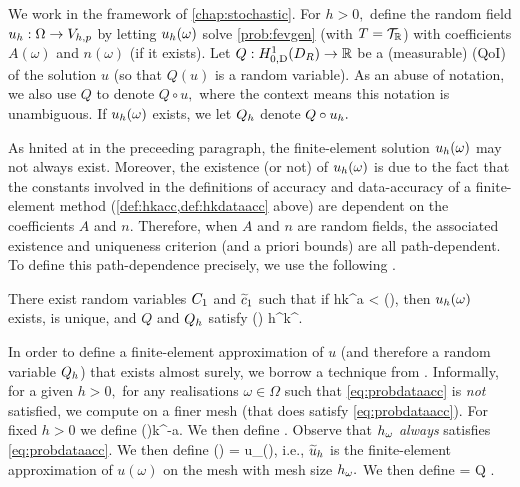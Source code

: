 We work in the framework of \cref{chap:stochastic}. For $h>0,$ define the random field $u_{h}:\Omega \rightarrow V_{h,p}$ by letting $u_{h}(\omega)$ solve \cref{prob:fevgen} (with $T = \mathcal T_{\mathbb R}$) with coefficients $A(\omega)$ and $n(\omega)$ (if it exists). Let $Q:\HozDDR\rightarrow\RR$ be a (measurable)  (QoI) of the solution $u$ (so that $Q(u)$ is a random variable). As an abuse of notation, we also use $Q$ to denote $Q \circ u,$ where the context means this notation is unambiguous. If $u_{h}(\omega)$ exists, we let $Q_{h}$ denote $Q \circ u_{h}.$

As hnited at in the preceeding paragraph, the finite-element solution $u_{h}(\omega)$ may not always exist. Moreover, the existence (or not) of $u_{h}(\omega)$ is due to the fact that the constants involved in the definitions of accuracy and data-accuracy of a finite-element method (\cref{def:hkacc,def:hkdataacc} above) are dependent on the coefficients $A$ and $n$. Therefore, when $A$ and $n$ are random fields, the associated existence and uniqueness criterion (and a priori bounds) are all path-dependent. To define this path-dependence precisely, we use the following .

\label{def:probdataacc}
There exist random variables $C_{1}$ and $\widetilde{c}_{1}$ such that if
\beq\label{eq:probdataacc}
hk^a < \Co(\omega),
\eeq
then $u_{h}(\omega)$ exists, is unique, and $Q$ and $Q_{h}$ satisfy
\beqs
{} \leq \cotilde(\omega) h^\alpha k^\sigma \Cfg.
\eeqs
\eas

In order to define a finite-element approximation of $u$ (and therefore a random variable $Q_{h}$) that exists almost surely, we borrow a technique from \cite{GrPaSc:19}. Informally, for a given $h>0,$ for any realisations $\omega \in \Omega$ such that \cref{eq:probdataacc} is \emph{not} satisfied, we compute on a finer mesh (that does satisfy \cref{eq:probdataacc}). For fixed $h>0$ we define
\beq\label{eq:hmaxomega}
\hmaxomega \de \Co(\omega)k^{-a}.
\eeq
We then define
\beq\label{eq:homega}
\homega \de \min{}.
\eeq
Observe that $h_{\omega}$ \emph{always} satisfies \cref{eq:probdataacc}. We then define
\beqs
\uhtilde(\omega) = u_{\homega}(\omega),
\eeqs
i.e., $\widetilde{u}_{h}$ is the finite-element approximation of $u(\omega)$ on the mesh with mesh size $h_{\omega}.$ We then define
\beq\label{eq:Qhtilde}
\Qhtilde = Q \circ \uhtilde.
\eeq
{}

